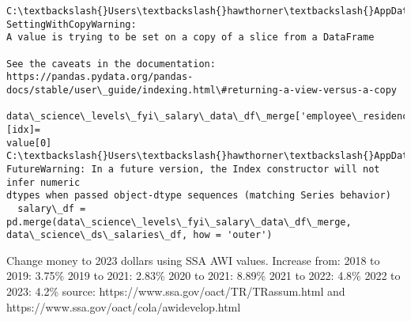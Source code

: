 \documentclass[11pt]{article}
\begin{document}
    \begin{Verbatim}[commandchars=\\\{\}]
C:\textbackslash{}Users\textbackslash{}hawthorner\textbackslash{}AppData\textbackslash{}Local\textbackslash{}Temp\textbackslash{}ipykernel\_22188\textbackslash{}1026206038.py:4:
SettingWithCopyWarning:
A value is trying to be set on a copy of a slice from a DataFrame

See the caveats in the documentation: https://pandas.pydata.org/pandas-
docs/stable/user\_guide/indexing.html\#returning-a-view-versus-a-copy
  data\_science\_levels\_fyi\_salary\_data\_df\_merge['employee\_residence'][idx]=
value[0]
C:\textbackslash{}Users\textbackslash{}hawthorner\textbackslash{}AppData\textbackslash{}Local\textbackslash{}Temp\textbackslash{}ipykernel\_22188\textbackslash{}1026206038.py:7:
FutureWarning: In a future version, the Index constructor will not infer numeric
dtypes when passed object-dtype sequences (matching Series behavior)
  salary\_df = pd.merge(data\_science\_levels\_fyi\_salary\_data\_df\_merge,
data\_science\_ds\_salaries\_df, how = 'outer')
    \end{Verbatim}

    Change money to 2023 dollars using SSA AWI values. Increase from: 2018
to 2019: 3.75\% 2019 to 2021: 2.83\% 2020 to 2021: 8.89\% 2021 to 2022:
4.8\% 2022 to 2023: 4.2\% source:
https://www.ssa.gov/oact/TR/TRassum.html and
https://www.ssa.gov/oact/cola/awidevelop.html
\end{document}
